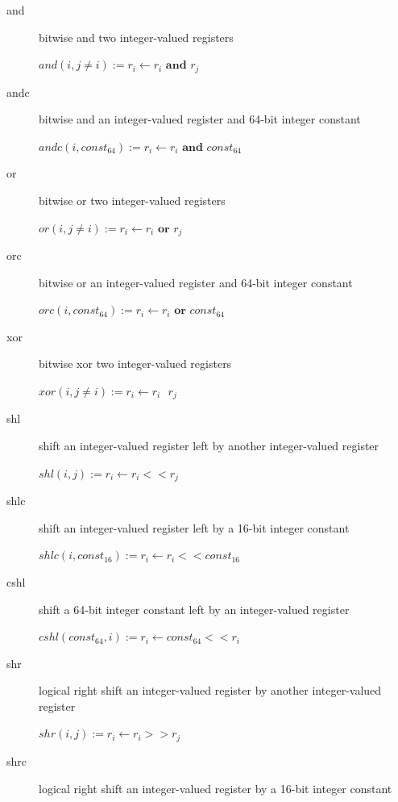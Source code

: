 \documentclass[english,a4paper]{article}
\begin{document}
\begin{description}
	\item[and] bitwise and two integer-valued registers
	
	$and(i, j\neq i) := r _{i} \longleftarrow  r _{i}  \textbf{ and } 
	r _{j} $ \\
	\item[andc] bitwise and an integer-valued register and 64-bit 
	integer
	constant
	
	$andc(i, const _{64}) :=  r _{i} \longleftarrow  r _{i} \textbf{ 
	and } const _{64} $ \\
	\item[or] bitwise or two integer-valued registers
	
	$or(i, j \neq i) := r _{i} \longleftarrow  r _{i} \textbf{ or } r 
	_{j} $  \\
	\item[orc] bitwise or an integer-valued register and 64-bit 
	integer
	constant
	
	$orc(i, const _{64}) :=  r _{i} \longleftarrow  r _{i} \textbf{ 
	or } const _{64} $ \\
	\item[xor] bitwise xor two integer-valued registers
	
	$xor(i, j \neq i) := r _{i} \longleftarrow  r _{i} \textbf{ \^{} 
	} r _{j} $ \\
	\item[shl] shift an integer-valued register left by another
	integer-valued register
	
	$shl(i, j) := r _{i} \longleftarrow  r _{i} << r _{j} $ \\
	\item[shlc] shift an integer-valued register left by a 16-bit 
	integer
	constant
	
	$shlc(i, const _{16}) :=  r _{i} \longleftarrow  r _{i} << const 
	_{16} $ \\
	\item[cshl] shift a 64-bit integer constant left by an 	integer-valued register
	
	$cshl(const _{64}, i):=  r _{i} \longleftarrow  const _{64} << r 
	_{i}  $ \\
	\item[shr] logical right shift an integer-valued register by 
	another integer-valued register
	
	$shr(i, j) := r _{i} \longleftarrow  r _{i} >> r _{j} $ \\
	\item[shrc] logical right shift an integer-valued register by a 
	16-bit integer constant
	

\end{description}
\end{document}
